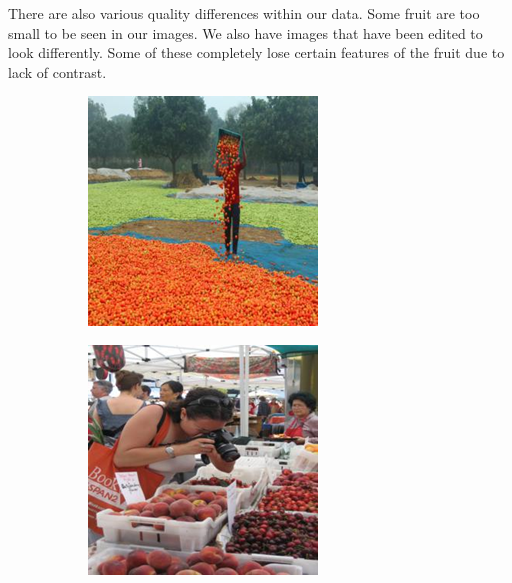 \documentclass[../main.tex]{subfiles}
\begin{document}
There are also various quality differences within our data. Some fruit are too small to be seen in our images. We also have images that have been edited to look differently. Some of these completely lose certain features of the fruit due to lack of contrast.

\begin{figure}[h!]
  \centering
  \begin{subfigure}[b]{0.2\linewidth}
    \includegraphics[width=\linewidth]{03-boundary/orangesea.png}
  \end{subfigure}
  \begin{subfigure}[b]{0.2\linewidth}
    \includegraphics[width=\linewidth]{03-boundary/fruitmarket.png}

\end{subfigure}
\end{figure}
\end{document}
